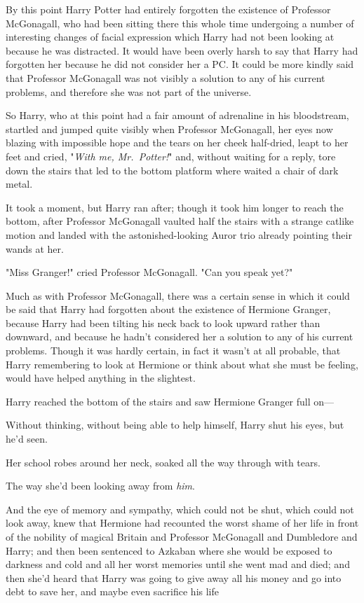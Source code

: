 By this point Harry Potter had entirely forgotten the existence of Professor 
McGonagall, who had been sitting there this whole time undergoing a number of 
interesting changes of facial expression which Harry had not been looking at 
because he was distracted. It would have been overly harsh to say that Harry 
had forgotten her because he did not consider her a PC. It could be more kindly 
said that Professor McGonagall was not visibly a solution to any of his current 
problems, and therefore she was not part of the universe.

So Harry, who at this point had a fair amount of adrenaline in his bloodstream, 
startled and jumped quite visibly when Professor McGonagall, her eyes now 
blazing with impossible hope and the tears on her cheek half-dried, leapt to 
her feet and cried, "\emph{With me, Mr.~Potter!}" and, without waiting for a 
reply, tore down the stairs that led to the bottom platform where waited a 
chair of dark metal.

It took a moment, but Harry ran after; though it took him longer to reach the 
bottom, after Professor McGonagall vaulted half the stairs with a strange 
catlike motion and landed with the astonished-looking Auror trio already 
pointing their wands at her.

"Miss Granger!" cried Professor McGonagall. "Can you speak yet?"

Much as with Professor McGonagall, there was a certain sense in which it could 
be said that Harry had forgotten about the existence of Hermione Granger, 
because Harry had been tilting his neck back to look upward rather than 
downward, and because he hadn't considered her a solution to any of his current 
problems. Though it was hardly certain, in fact it wasn't at all probable, that 
Harry remembering to look at Hermione or think about what she must be feeling, 
would have helped anything in the slightest.

Harry reached the bottom of the stairs and saw Hermione Granger full on---

Without thinking, without being able to help himself, Harry shut his eyes, but 
he'd seen.

Her school robes around her neck, soaked all the way through with tears.

The way she'd been looking away from \emph{him}.

And the eye of memory and sympathy, which could not be shut, which could not 
look away, knew that Hermione had recounted the worst shame of her life in 
front of the nobility of magical Britain and Professor McGonagall and 
Dumbledore and Harry; and then been sentenced to Azkaban where she would be 
exposed to darkness and cold and all her worst memories until she went mad and 
died; and then she'd heard that Harry was going to give away all his money and 
go into debt to save her, and maybe even sacrifice his life

